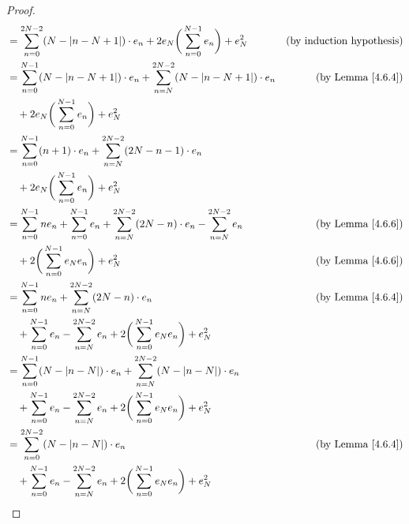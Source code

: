 \begin{proof}
\begin{align*}
         & = \sum_{n = 0}^{2N - 2} (N - \abs*{n - N + 1}) \cdot e_n + 2 e_N \bigg(\sum_{n = 0}^{N - 1} e_n\bigg) + e_N^2                  & \text{(by induction hypothesis)} \\
         & = \sum_{n = 0}^{N - 1} (N - \abs*{n - N + 1}) \cdot e_n + \sum_{n = N}^{2N - 2} (N - \abs*{n - N + 1}) \cdot e_n               & \text{(by Lemma \ref{4.6.4})}    \\
         & \quad + 2 e_N \bigg(\sum_{n = 0}^{N - 1} e_n\bigg) + e_N^2                                                                                                        \\
         & = \sum_{n = 0}^{N - 1} (n + 1) \cdot e_n + \sum_{n = N}^{2N - 2} (2N - n - 1) \cdot e_n                                                                           \\
         & \quad + 2 e_N \bigg(\sum_{n = 0}^{N - 1} e_n\bigg) + e_N^2                                                                                                        \\
         & = \sum_{n = 0}^{N - 1} n e_n + \sum_{n = 0}^{N - 1} e_n + \sum_{n = N}^{2N - 2} (2N - n) \cdot e_n - \sum_{n = N}^{2N - 2} e_n & \text{(by Lemma \ref{4.6.6})}    \\
         & \quad + 2 \bigg(\sum_{n = 0}^{N - 1} e_N e_n\bigg) + e_N^2                                                                     & \text{(by Lemma \ref{4.6.6})}    \\
         & = \sum_{n = 0}^{N - 1} n e_n + \sum_{n = N}^{2N - 2} (2N - n) \cdot e_n                                                        & \text{(by Lemma \ref{4.6.4})}    \\
         & \quad + \sum_{n = 0}^{N - 1} e_n - \sum_{n = N}^{2N - 2} e_n + 2 \bigg(\sum_{n = 0}^{N - 1} e_N e_n\bigg) + e_N^2                                                 \\
         & = \sum_{n = 0}^{N - 1} (N - \abs*{n - N}) \cdot e_n + \sum_{n = N}^{2N - 2} (N - \abs*{n - N}) \cdot e_n                                                          \\
         & \quad + \sum_{n = 0}^{N - 1} e_n - \sum_{n = N}^{2N - 2} e_n + 2 \bigg(\sum_{n = 0}^{N - 1} e_N e_n\bigg) + e_N^2                                                 \\
         & = \sum_{n = 0}^{2N - 2} (N - \abs*{n - N}) \cdot e_n                                                                           & \text{(by Lemma \ref{4.6.4})}    \\
         & \quad + \sum_{n = 0}^{N - 1} e_n - \sum_{n = N}^{2N - 2} e_n + 2 \bigg(\sum_{n = 0}^{N - 1} e_N e_n\bigg) + e_N^2

\end{align*}
\end{proof}

